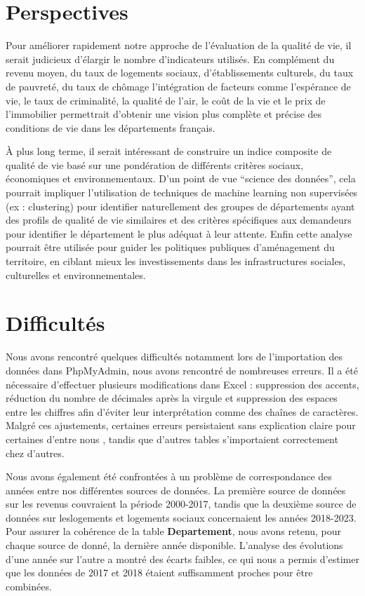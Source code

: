 \documentclass[mstat,12pt]{unswthesis}
\begin{document}
\section{Perspectives}\label{perspectives}

Pour améliorer rapidement notre approche de l'évaluation de la qualité
de vie, il serait judicieux d'élargir le nombre d'indicateurs utilisés.
En complément du revenu moyen, du taux de logements sociaux,
d'établissements culturels, du taux de pauvreté, du taux de chômage
l'intégration de facteurs comme l'espérance de vie, le taux de
criminalité, la qualité de l'air, le coût de la vie et le prix de
l'immobilier permettrait d'obtenir une vision plus complète et précise
des conditions de vie dans les départements français.

\bigskip

À plus long terme, il serait intéressant de construire un indice
composite de qualité de vie basé sur une pondération de différents
critères sociaux, économiques et environnementaux. D'un point de vue
``science des données'', cela pourrait impliquer l'utilisation de
techniques de machine learning non supervisées (ex : clustering) pour
identifier naturellement des groupes de départements ayant des profils
de qualité de vie similaires et des critères spécifiques aux demandeurs
pour identifier le département le plus adéquat à leur attente. Enfin
cette analyse pourrait être utilisée pour guider les politiques
publiques d'aménagement du territoire, en ciblant mieux les
investissements dans les infrastructures sociales, culturelles et
environnementales.

\section{Difficultés}\label{difficultuxe9s}

Nous avons rencontré quelques difficultés notamment lors de
l'importation des données dans PhpMyAdmin, nous avons rencontré de
nombreuses erreurs. Il a été nécessaire d'effectuer plusieurs
modifications dans Excel : suppression des accents, réduction du nombre
de décimales après la virgule et suppression des espaces entre les
chiffres afin d'éviter leur interprétation comme des chaînes de
caractères. Malgré ces ajustements, certaines erreurs persistaient sans
explication claire pour certaines d'entre nous , tandis que d'autres
tables s'importaient correctement chez d'autres.

\medskip

Nous avons également été confrontées à un problème de correspondance des
années entre nos différentes sources de données. La première source de
données sur les revenus couvraient la période 2000-2017, tandis que la
deuxième source de données sur leslogements et logements sociaux
concernaient les années 2018-2023. Pour assurer la cohérence de la table
\textbf{Departement}, nous avons retenu, pour chaque source de donné, la
dernière année disponible. L'analyse des évolutions d'une année sur
l'autre a montré des écarts faibles, ce qui nous a permis d'estimer que
les données de 2017 et 2018 étaient suffisamment proches pour être
combinées.
\end{document}
